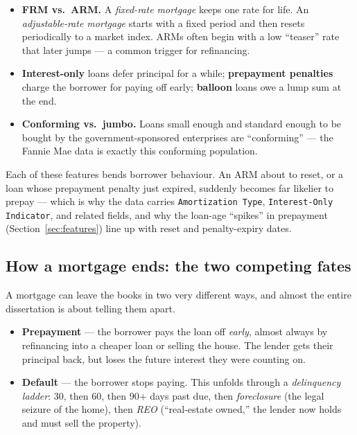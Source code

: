 \documentclass[11pt]{article}
\begin{document}
\begin{itemize}[leftmargin=1.4em, itemsep=2pt]
  \item \textbf{FRM vs.\ ARM.} A \emph{fixed-rate mortgage} keeps one rate for life. An
        \emph{adjustable-rate mortgage} starts with a fixed period and then resets
        periodically to a market index. ARMs often begin with a low ``teaser'' rate that
        later jumps --- a common trigger for refinancing.
  \item \textbf{Interest-only} loans defer principal for a while; \textbf{prepayment
        penalties} charge the borrower for paying off early; \textbf{balloon} loans owe a
        lump sum at the end.
  \item \textbf{Conforming vs.\ jumbo.} Loans small enough and standard enough to be bought
        by the government-sponsored enterprises are ``conforming'' --- the Fannie Mae data is
        exactly this conforming population.
\end{itemize}

\begin{intuition}
Each of these features bends borrower behaviour. An ARM about to reset, or a loan whose
prepayment penalty just expired, suddenly becomes far likelier to prepay --- which is why the
data carries \texttt{Amortization Type}, \texttt{Interest-Only Indicator}, and related fields,
and why the loan-age ``spikes'' in prepayment (Section~\ref{sec:features}) line up with reset
and penalty-expiry dates.
\end{intuition}

\subsection{How a mortgage ends: the two competing fates}

A mortgage can leave the books in two very different ways, and almost the entire dissertation
is about telling them apart.

\begin{itemize}[leftmargin=1.4em, itemsep=2pt]
  \item \textbf{Prepayment} --- the borrower pays the loan off \emph{early}, almost always by
        refinancing into a cheaper loan or selling the house. The lender gets their principal
        back, but loses the future interest they were counting on.
  \item \textbf{Default} --- the borrower stops paying. This unfolds through a
        \emph{delinquency ladder}: 30, then 60, then 90+ days past due, then
        \emph{foreclosure} (the legal seizure of the home), then \emph{REO} (``real-estate
        owned,'' the lender now holds and must sell the property).
\end{itemize}
\end{document}
